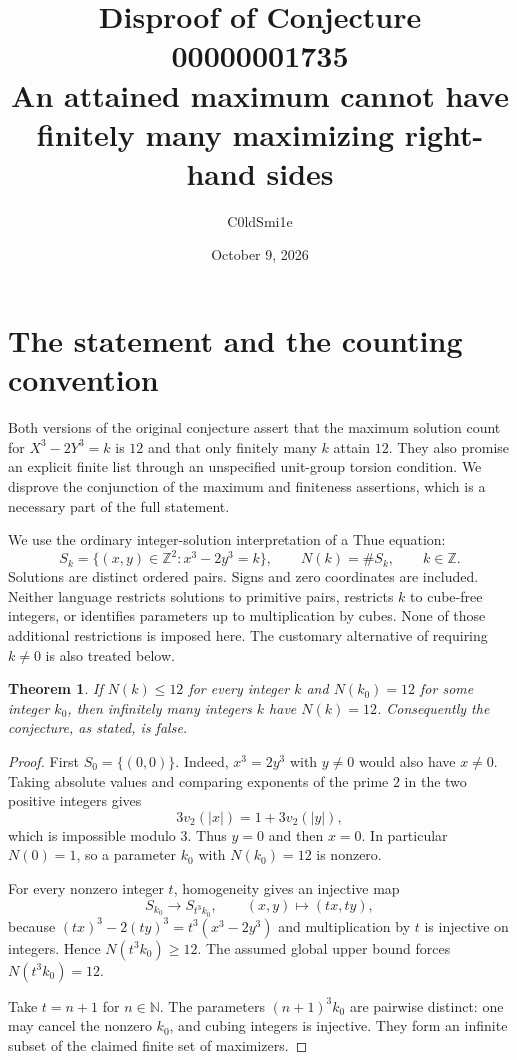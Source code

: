 \documentclass[11pt]{article}
\title{Disproof of Conjecture 00000001735\\[0.35em]
\large An attained maximum cannot have finitely many maximizing right-hand sides}
\author{C0ldSmi1e}
\date{October 9, 2026}
\newcommand{\Z}{\mathbb Z}
\newcommand{\N}{\mathbb N}
\newtheorem*{theorem}{Theorem}
\begin{document}
\maketitle
\vspace{-1.2em}

\section{The statement and the counting convention}

Both versions of the original conjecture assert that the maximum solution count
for $X^3-2Y^3=k$ is $12$ and that only finitely many $k$ attain $12$.
They also promise an explicit finite list through an unspecified unit-group
torsion condition. We disprove the conjunction of the maximum and finiteness
assertions, which is a necessary part of the full statement.

We use the ordinary integer-solution interpretation of a Thue equation:
\[
 S_k=\{(x,y)\in\Z^2:x^3-2y^3=k\},\qquad N(k)=\#S_k,
 \qquad k\in\Z.
\]
Solutions are distinct ordered pairs. Signs and zero coordinates are included.
Neither language restricts solutions to primitive pairs, restricts $k$ to
cube-free integers, or identifies parameters up to multiplication by cubes.
None of those additional restrictions is imposed here. The customary alternative
of requiring $k\ne0$ is also treated below.

\begin{theorem}
If $N(k)\le12$ for every integer $k$ and $N(k_0)=12$ for some integer $k_0$,
then infinitely many integers $k$ have $N(k)=12$. Consequently the conjecture,
as stated, is false.
\end{theorem}

\begin{proof}
First $S_0=\{(0,0)\}$. Indeed, $x^3=2y^3$ with $y\ne0$ would also have
$x\ne0$. Taking absolute values and comparing exponents of the prime $2$
in the two positive integers gives
\[
 3v_2(|x|)=1+3v_2(|y|),
\]
which is impossible modulo $3$. Thus $y=0$ and then $x=0$.
In particular $N(0)=1$, so a parameter $k_0$ with $N(k_0)=12$ is nonzero.

For every nonzero integer $t$, homogeneity gives an injective map
\[
 S_{k_0}\longrightarrow S_{t^3k_0},\qquad (x,y)\longmapsto(tx,ty),
\]
because $(tx)^3-2(ty)^3=t^3(x^3-2y^3)$ and multiplication by $t$ is
injective on integers. Hence $N(t^3k_0)\ge12$. The assumed global upper bound
forces $N(t^3k_0)=12$.

Take $t=n+1$ for $n\in\N$. The parameters $(n+1)^3k_0$ are pairwise distinct:
one may cancel the nonzero $k_0$, and cubing integers is injective.
They form an infinite subset of the claimed finite set of maximizers.
\end{proof}
\end{document}
